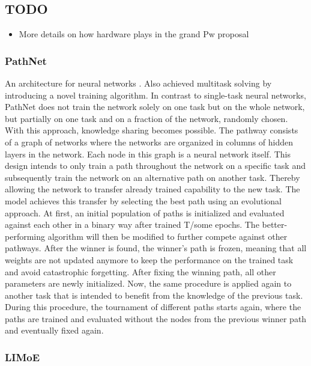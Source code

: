 \documentclass[
]{krantz}
\providecommand{\tightlist}{%
  \setlength{\itemsep}{0pt}\setlength{\parskip}{0pt}}
\begin{document}
\hypertarget{todo-3}{%
\subsection{TODO}\label{todo-3}}

\begin{itemize}
\tightlist
\item
  More details on how hardware plays in the grand Pw proposal
\end{itemize}

\hypertarget{pathnet}{%
\subsubsection{PathNet}\label{pathnet}}

An architecture for neural networks \citet{Fernando2017}. Also achieved multitask solving by introducing a novel training algorithm. In contrast to single-task neural networks, PathNet does not train the network solely on one task but on the whole network, but partially on one task and on a fraction of the network, randomly chosen. With this approach, knowledge sharing becomes possible.
The pathway consists of a graph of networks where the networks are organized in columns of hidden layers in the network. Each node in this graph is a neural network itself. This design intends to only train a path throughout the network on a specific task and subsequently train the network on an alternative path on another task. Thereby allowing the network to transfer already trained capability to the new task.
The model achieves this transfer by selecting the best path using an evolutional approach. At first, an initial population of paths is initialized and evaluated against each other in a binary way after trained T/some epochs. The better-performing algorithm will then be modified to further compete against other pathways. After the winner is found, the winner's path is frozen, meaning that all weights are not updated anymore to keep the performance on the trained task and avoid catastrophic forgetting. After fixing the winning path, all other parameters are newly initialized.
Now, the same procedure is applied again to another task that is intended to benefit from the knowledge of the previous task. During this procedure, the tournament of different paths starts again, where the paths are trained and evaluated without the nodes from the previous winner path and eventually fixed again.

\hypertarget{limoe}{%
\subsubsection{LIMoE}\label{limoe}}
\end{document}
